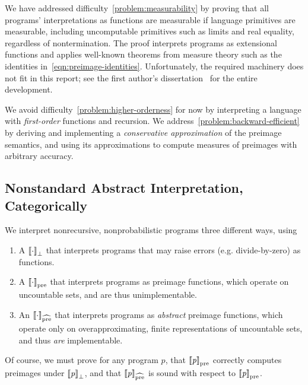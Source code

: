 \documentclass{llncs}
\newcommand{\todo}[1]{}
\newcommand{\pre}{_\mathrm{pre}}
\newcommand{\prehat}{_\mathrm{\widehat{pre}}}
\begin{document}
We have addressed difficulty~\ref{problem:measurability} by proving that all programs' interpretations as functions are measurable if language primitives are measurable, including uncomputable primitives such as limits and real equality, regardless of nontermination.
The proof interprets programs as extensional functions and applies well-known theorems from measure theory such as the identities in~\eqref{eqn:preimage-identities}.
Unfortunately, the required machinery does not fit in this report; see the first author's dissertation~\cite{cit:toronto-thesis} for the entire development.

We avoid difficulty~\ref{problem:higher-orderness} for now by interpreting a language with \emph{first-order} functions and recursion.
We address~\ref{problem:backward-efficient} by deriving and implementing a \emph{conservative approximation} of the preimage semantics, and using its approximations to compute measures of preimages with arbitrary accuracy.

\subsection{Nonstandard Abstract Interpretation, Categorically}

\todo{David: Need a transition from previous subsection.}

\todo{David: Need some forward-looking intuition about why you need the following.}

We interpret nonrecursive, nonprobabilistic programs three different ways, using
\begin{enumerate}
	\item A  $\left\llbracket{\cdot}\right\rrbracket_\bot$ that interprets programs that may raise errors (e.g. divide-by-zero) as functions.
	\item A  $\meaningof{\cdot}\pre$ that interprets programs as preimage functions, which operate on uncountable sets, and are thus unimplementable.
	\item An  $\meaningof{\cdot}\prehat$ that interprets programs as \emph{abstract} preimage functions, which operate only on overapproximating, finite representations of uncountable sets, and thus \emph{are} implementable.
\end{enumerate}
Of course, we must prove for any program $\mathit{p}$, that $\meaningof{\mathit{p}}\pre$ correctly computes preimages under $\left\llbracket{\mathit{p}}\right\rrbracket_\bot$, and that $\meaningof{\mathit{p}}\prehat$ is sound with respect to $\meaningof{\mathit{p}}\pre$.
\end{document}
